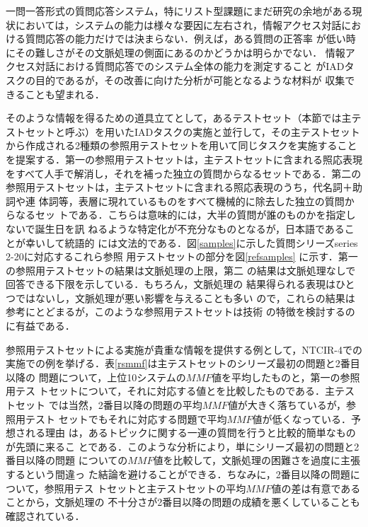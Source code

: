 \documentclass[japanese]{jnlp_1.4}
\begin{document}
一問一答形式の質問応答システム，特にリスト型課題にまだ研究の余地がある現
状においては，システムの能力は様々な要因に左右され，情報アクセス対話にお
ける質問応答の能力だけでは決まらない．例えば，ある質問の正答率
が低い時にその難しさがその文脈処理の側面にあるのかどうかは明らかでない．
情報アクセス対話における質問応答でのシステム全体の能力を測定すること
がIADタスクの目的であるが，その改善に向けた分析が可能となるような材料が
収集できることも望まれる．

そのような情報を得るための道具立てとして，あるテストセット（本節では主テ
ストセットと呼ぶ）を用いたIADタスクの実施と並行して，その主テストセット
から作成される2種類の参照用テストセットを用いて同じタスクを実施すること
を提案する．第一の参照用テストセットは，主テストセットに含まれる照応表現
をすべて人手で解消し，それを補った独立の質問からなるセットである．第二の
参照用テストセットは，主テストセットに含まれる照応表現のうち，代名詞＋助詞や連
体詞等，表層に現れているものをすべて機械的に除去した独立の質問からなるセッ
トである．こちらは意味的には，大半の質問が誰のものかを指定しないで誕生日を訊
ねるような特定化が不充分なものとなるが，日本語であることが幸いして統語的
には文法的である．図\ref{samples}に示した質問シリーズseries 2-20に対応するこれら参照
用テストセットの部分を図\ref{refsamples}
に示す．第一の参照用テストセットの結果は文脈処理の上限，第二
の結果は文脈処理なしで回答できる下限を示している．もちろん，文脈処理の
結果得られる表現はひとつではないし，文脈処理が悪い影響を与えることも多い
ので，これらの結果は参考にとどまるが，このような参照用テストセットは技術
の特徴を検討するのに有益である．

参照用テストセットによる実施が貴重な情報を提供する例として，NTCIR-4での
実施での例を挙げる．表\ref{rsmmf}は主テストセットのシリーズ最初の問題と2番目以降の
問題について，上位10システムの$\mathit{MMF}$値を平均したものと，第一の参照用テス
トセットについて，それに対応する値とを比較したものである．主テストセット
では当然，2番目以降の問題の平均$\mathit{MMF}$値が大きく落ちているが，参照用テスト
セットでもそれに対応する問題で平均$\mathit{MMF}$値が低くなっている．予想される理由
は，あるトピックに関する一連の質問を行うと比較的簡単なものが先頭に来るこ
とである．このような分析により，単にシリーズ最初の問題と2番目以降の問題
についての$\mathit{MMF}$値を比較して，文脈処理の困難さを過度に主張するという間違っ
た結論を避けることができる．ちなみに，2番目以降の問題について，参照用テス
トセットと主テストセットの平均$\mathit{MMF}$値の差は有意であることから，文脈処理の
不十分さが2番目以降の問題の成績を悪くしていることも確認されている．
\end{document}
